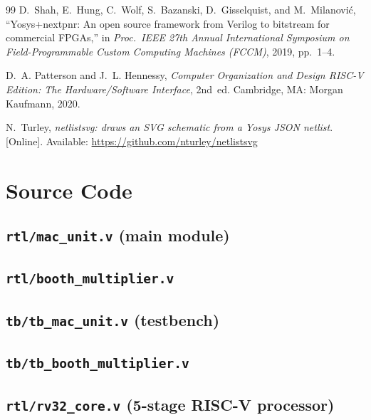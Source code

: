 \documentclass[11pt,a4paper]{report}
\newcommand{\code}[1]{\texttt{#1}}
\begin{document}
\begin{thebibliography}{99}
D.~Shah, E.~Hung, C.~Wolf, S.~Bazanski, D.~Gisselquist, and M.~Milanovi\'c,
``Yosys+nextpnr: An open source framework from Verilog to bitstream for
commercial FPGAs,'' in \emph{Proc.\ IEEE 27th Annual International Symposium
on Field-Programmable Custom Computing Machines (FCCM)}, 2019, pp.~1--4.

D.~A. Patterson and J.~L. Hennessy, \emph{Computer Organization and Design
RISC-V Edition: The Hardware/Software Interface}, 2nd~ed. Cambridge, MA:
Morgan Kaufmann, 2020.

N.~Turley, \emph{netlistsvg: draws an SVG schematic from a Yosys JSON netlist}.
[Online]. Available: \url{https://github.com/nturley/netlistsvg}

\end{thebibliography}

\appendix
\chapter{Source Code}\label{app:src}

\section{\code{rtl/mac\_unit.v} (main module)}


\section{\code{rtl/booth\_multiplier.v}}


\section{\code{tb/tb\_mac\_unit.v} (testbench)}


\section{\code{tb/tb\_booth\_multiplier.v}}


\section{\code{rtl/rv32\_core.v} (5-stage RISC-V processor)}

\end{document}

